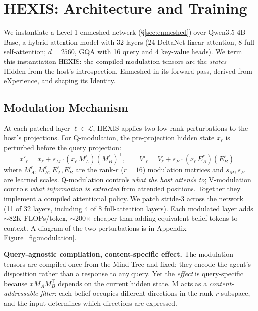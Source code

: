 \section{HEXIS: Architecture and Training}
\label{sec:hexis}

We instantiate a Level 1 enmeshed network (\S\ref{sec:enmeshed}) over Qwen3.5-4B-Base, a hybrid-attention model with 32 layers (24 DeltaNet linear attention, 8 full self-attention; $d=2560$, GQA with 16 query and 4 key-value heads). We term this instantiation HEXIS: the compiled modulation tensors are the \emph{states}---Hidden from the host's introspection, Enmeshed in its forward pass, derived from eXperience, and shaping its Identity.

\subsection{Modulation Mechanism}
\label{sec:modulation}

At each patched layer $\ell \in \mathcal{L}$, HEXIS applies two low-rank perturbations to the host's projections. For Q-modulation, the pre-projection hidden state $x_\ell$ is perturbed before the query projection:
\begin{equation}
x'_\ell = x_\ell + s_M \cdot (x_\ell \, M_A^\ell) (M_B^\ell)^\top, \qquad
V'_\ell = V_\ell + s_E \cdot (x_\ell \, E_A^\ell) (E_B^\ell)^\top
\label{eq:qv_mod}
\end{equation}
where $M_A^\ell, M_B^\ell, E_A^\ell, E_B^\ell$ are the rank-$r$ ($r=16$) modulation matrices and $s_M, s_E$ are learned scales. Q-modulation controls \emph{what the host attends to}; V-modulation controls \emph{what information is extracted} from attended positions. Together they implement a compiled attentional policy. We patch stride-3 across the network (11 of 32 layers, including 4 of 8 full-attention layers). Each modulated layer adds $\sim$82K FLOPs/token, $\sim$200$\times$ cheaper than adding equivalent belief tokens to context. A diagram of the two perturbations is in Appendix Figure~\ref{fig:modulation}.

\textbf{Query-agnostic compilation, content-specific effect.} The modulation tensors are compiled once from the Mind Tree and fixed; they encode the agent's disposition rather than a response to any query. Yet the \emph{effect} is query-specific because $x M_A M_B^\top$ depends on the current hidden state. M acts as a \emph{content-addressable filter}: each belief occupies different directions in the rank-$r$ subspace, and the input determines which directions are expressed.

